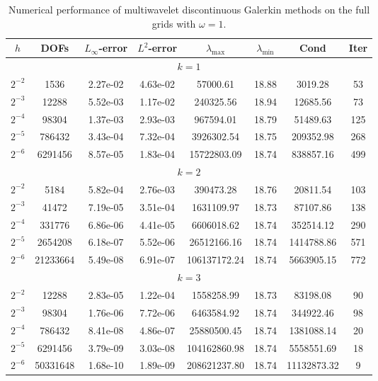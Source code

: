 \documentclass[final,leqno]{siamltex704}
\begin{document}
\begin{table}
\caption{Numerical performance of multiwavelet discontinuous Galerkin methods on the full grids with $\omega=1.$}
\begin{tabular}{cccccccc}\hline\hline
$h$ & DOFs & $L_{\infty}$-error & $L^2$-error & $\lambda_{\max}$ & $\lambda_{\min}$ & Cond & Iter \\ \hline
\multicolumn{8}{c}{$k=1$}\\ \hline
$2^{-2}$	&1536      &2.27e-02   &4.63e-02   &57000.61        &18.88   &3019.28       &53\\
$2^{-3}$   &12288    &5.52e-03   &1.17e-02   &240325.56      &18.94   &12685.56     &73\\
$2^{-4}$   &98304    &1.37e-03   &2.93e-03   &967594.01      &18.79   &51489.63     &125\\
$2^{-5}$   &786432  &3.43e-04   &7.32e-04   &3926302.54    &18.75   &209352.98   &268\\
$2^{-6}$   &6291456 &8.57e-05  &1.83e-04   &15722803.09  &18.74   &838857.16   &499\\   \hline
\multicolumn{8}{c}{$k=2$}\\ \hline
$2^{-2}$	&5184	&5.82e-04   &2.76e-03    &390473.28       &18.76 &20811.54     &103\\
$2^{-3}$	&41472	&7.19e-05   &3.51e-04    &1631109.97     &18.73 &87107.86     &138\\
$2^{-4}$	&331776	&6.86e-06   &4.41e-05    &6606018.62     &18.74 &352514.12   &290\\
$2^{-5}$	&2654208	&6.18e-07   &5.52e-06    &26512166.16   &18.74 &1414788.86 &571\\
$2^{-6}$	&21233664&5.49e-08  &6.91e-07   &106137172.24 &18.74 &5663905.15  &772\\
\hline
\multicolumn{8}{c}{$k=3$}\\ \hline
$2^{-2}$	&12288	  &2.83e-05   &1.22e-04  &1558258.99     &18.73 &83198.08     &90\\
$2^{-3}$	&98304	  &1.76e-06   &7.72e-06  &6463584.92     &18.74 &344922.46   &98\\
$2^{-4}$	&786432	  &8.41e-08   &4.86e-07  &25880500.45   &18.74 &1381088.14 &20\\
$2^{-5}$	&6291456	  &3.79e-09   &3.03e-08  &104162860.98 &18.74 &5558551.69  &18\\
$2^{-6}$	&50331648&1.68e-10   &1.89e-09  &208621237.80 &18.74 &11132873.32 &9\\ \hline
\end{tabular}
\end{table}
\end{document}
